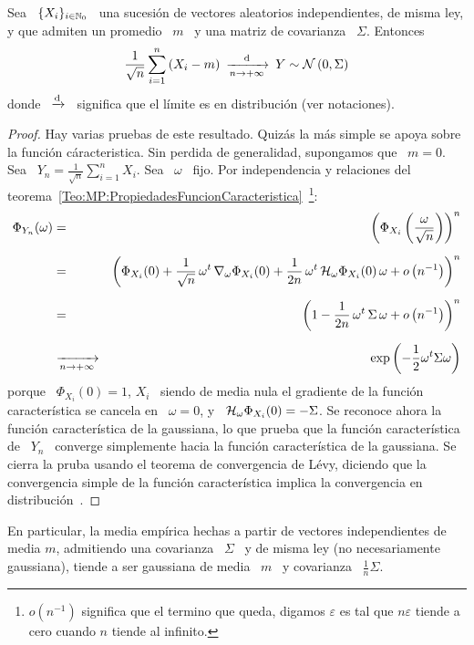 \begin{teorema}\label{Teo:MP:CLT}
%
  Sea  \  $\{  X_i \}_{i  \in  \mathbb{N}_0}$  \  una  sucesi\'on de  vectores  aleatorios
  independientes, de misma ley,  y que admiten un promedio \ $m$  \ y una matriz
  de covarianza \ $\Sigma$. Entonces
  \[
  \frac{1}{\sqrt{n}}  \sum_{i=1}^n  \left( X_i  -  m  \right)  \: \xrightarrow[n  \to
    +\infty]{\mathrm{d}} \: Y \sim \mathcal{N}\left( 0 , \Sigma \right)
  \]
  donde  \ $\xrightarrow[]{\mathrm{d}}$ \  significa que  el l\'imite  es en  distribuci\'on (ver
  notaciones).
\end{teorema}
\begin{proof}
  Hay varias pruebas de este resultado.  Quiz\'as la m\'as simple se apoya sobre
  la funci\'on  c\'aracteristica.  Sin perdida de generalidad,  supongamos que \
  $m = 0$. Sea \ $\displaystyle Y_n = \frac{1}{\sqrt{n}} \sum_{i=1}^n X_i$.  Sea
  \    $\omega$    \    fijo.     Por    independencia    y    relaciones    del
  teorema~\ref{Teo:MP:PropiedadesFuncionCaracteristica}~\footnote{$o\left(
      n^{-1} \right)$ significa que  el termino que queda, digamos $\varepsilon$
    es tal que $n \varepsilon$ tiende a cero cuando $n$ tiende al infinito.}:
  \begin{eqnarray*}
  \Phi_{Y_n}(\omega) & = & \left( \Phi_{X_i}\left( \frac{\omega}{\sqrt{n}}
  \right) \right)^n\\[2mm]
& = & \left( \Phi_{X_i}(0) + \frac{1}{\sqrt{n}} \, \omega^t \, \nabla_\omega
  \Phi_{X_i}(0) + \frac{1}{2 n} \, \omega^t \, \mathcal{H}_\omega\Phi_{X_i}(0) \, \omega +
  o\left( n^{-1} \right) \right)^n\\[2mm]
  & = & \left( 1 - \frac{1}{2 n} \, \omega^t \, \Sigma \, \omega +
  o\left( n^{-1} \right) \right)^n\\[2mm]
  & \xrightarrow[n \to +\infty]{} & \exp\left( -\frac12 \omega^t \Sigma \omega \right)
  \end{eqnarray*}
  porque \ $\Phi_{X_i}(0) = 1$, $X_i$ \  siendo de media nula el gradiente de la
  funci\'on   caracter\'istica   se  cancela   en   \   $\omega   =  0$,   y   \
  $\mathcal{H}_\omega\Phi_{X_i}(0)  =  -  \Sigma$.   Se reconoce  ahora  la  funci\'on
  caracter\'istica   de  la   gaussiana,   lo  que   prueba   que  la   funci\'on
  caracter\'istica  de  \  $Y_n$  \  converge  simplemente  hacia  la  funci\'on
  caracter\'istica  de la gaussiana.   Se cierra  la pruba  usando el  teorema de
  convergencia de  L\'evy, diciendo que  la convergencia simple de  la funci\'on
  caracter\'istica  implica  la  convergencia en  distribuci\'on~\cite{AshDol99,
    Bil12, AthLah06}.
\end{proof}
%
En particular, la  media emp\'irica hechas a partir  de vectores independientes de
media  $m$,  admitiendo  una  covarianza  \  $\Sigma$  \  y  de  misma  ley  (no
necesariamente gaussiana), tiende a ser gaussiana  de media \ $m$ \ y covarianza \
$\frac{1}{n} \Sigma$.

